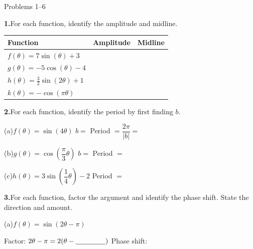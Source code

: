 \documentclass[10pt]{article}
\begin{document}
\namedateperiod

\vspace{0.10in}

\begin{notesbox}{Problems 1--6}

\textbf{1.}\quad For each function, identify the amplitude and midline.

\vspace{4pt}
\renewcommand{\arraystretch}{1.5}
\begin{tabular}{|l|c|c|}
\hline
\textbf{Function} & \textbf{Amplitude} & \textbf{Midline} \\
\hline
$f(\theta) = 7\sin(\theta) + 3$ & & \\
\hline
$g(\theta) = -5\cos(\theta) - 4$ & & \\
\hline
$h(\theta) = \tfrac{3}{2}\sin(2\theta) + 1$ & & \\
\hline
$k(\theta) = -\cos(\pi\theta)$ & & \\
\hline
\end{tabular}

\vspace{0.12in}
\textbf{2.}\quad For each function, identify the period by first finding $b$.

\vspace{4pt}
(a)\quad $f(\theta) = \sin(4\theta)$ \qquad $b = $ \underline{\hspace{1.2cm}}
\qquad Period $= \dfrac{2\pi}{|b|} = $ \underline{\hspace{2cm}}

\vspace{6pt}
(b)\quad $g(\theta) = \cos\!\left(\dfrac{\pi}{3}\theta\right)$ \qquad $b = $ \underline{\hspace{1.2cm}}
\qquad Period $= $ \underline{\hspace{2cm}}

\vspace{6pt}
(c)\quad $h(\theta) = 3\sin\!\left(\dfrac{1}{4}\theta\right) - 2$ \qquad Period $= $ \underline{\hspace{2cm}}

\vspace{0.12in}
\textbf{3.}\quad For each function, factor the argument and identify the phase shift.
State the direction and amount.

\vspace{4pt}
(a)\quad $f(\theta) = \sin(2\theta - \pi)$

\vspace{2pt}
Factor: $2\theta - \pi = 2\!\left(\theta - \underline{\hspace{1.5cm}}\right)$
\quad Phase shift: \underline{\hspace{3.5cm}}


\end{notesbox}
\end{document}
